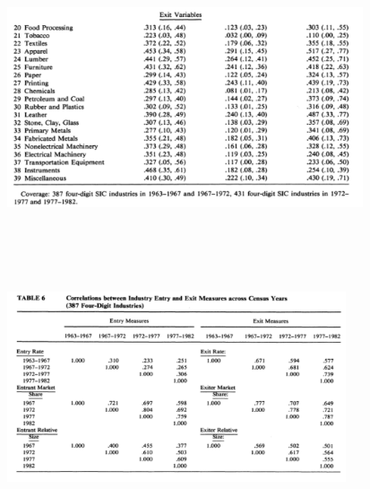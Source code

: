 \documentclass[dvipdfmx,12pt]{beamer}
\begin{document}
\begin{frame}

\begin{center}

\includegraphics[width=10.5cm,height=7.75cm]{DRS_T5b.pdf}

\end{center}

\end{frame}

\begin{frame}

\begin{center}

\includegraphics[width=10cm,height=7.75cm]{DRS_T6.pdf}

\end{center}

\end{frame}
\end{document}
